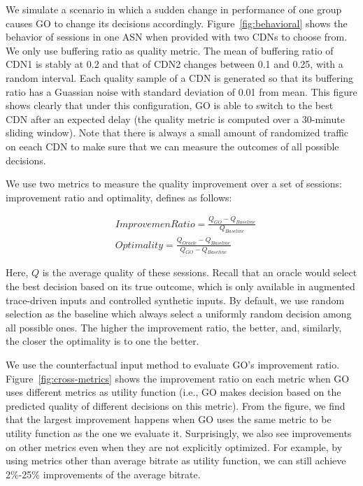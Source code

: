  We simulate a scenario in which a sudden
change in performance of one group causes GO to change its decisions
accordingly. Figure~\ref{fig:behavioral} shows the behavior of
sessions in one ASN when provided with two CDNs to choose from. We
only use buffering ratio as quality metric. The mean of buffering
ratio of CDN1 is stably at 0.2 and that of CDN2 changes between 0.1
and 0.25, with a random interval. Each quality sample of a CDN is
generated so that its buffering ratio has a Guassian noise with
standard deviation of 0.01 from mean. This figure shows clearly that
under this configuration, GO is able to switch to the best CDN after
an expected delay (the quality metric is computed over a 30-minute
sliding window). Note that there is always a small amount of
randomized traffic on eeach CDN to make sure that we can measure the
outcomes of all possible decisions. 



\label{subsec:go-improve}

We use two metrics to measure the quality improvement over a set of
sessions: improvement ratio and optimality, defines as follows:

\begin{align*}
& ImprovemenRatio=\frac{Q_{GO}-Q_{Baseline}}{Q_{Baseline}}\\
& Optimality=\frac{Q_{Oracle}-Q_{Baseline}}{Q_{GO}-Q_{Baseline}}
\end{align*}

Here, $Q$ is the average quality of these sessions. Recall that an
oracle would select the best decision based on its true outcome, which
is only available in augmented trace-driven inputs and controlled
synthetic inputs.  By default, we use random selection as the baseline
which always select a uniformly random decision among all possible
ones. The higher the improvement ratio, the better, and, similarly,
the closer the optimality is to one the better.

We use the counterfactual input method to evaluate GO's improvement
ratio. Figure~\ref{fig:cross-metrics} shows the improvement ratio on
each metric when GO uses different metrics as utility function (i.e.,
GO makes decision based on the predicted quality of different
decisions on this metric). From the figure, we find that the largest
improvement happens when GO uses the same metric to be utility
function as the one we evaluate it. Surprisingly, we also see
improvements on other metrics even when they are not explicitly
optimized. For example, by using metrics other than average bitrate as
utility function, we can still achieve 2\%-25\% improvements of the
average bitrate.


